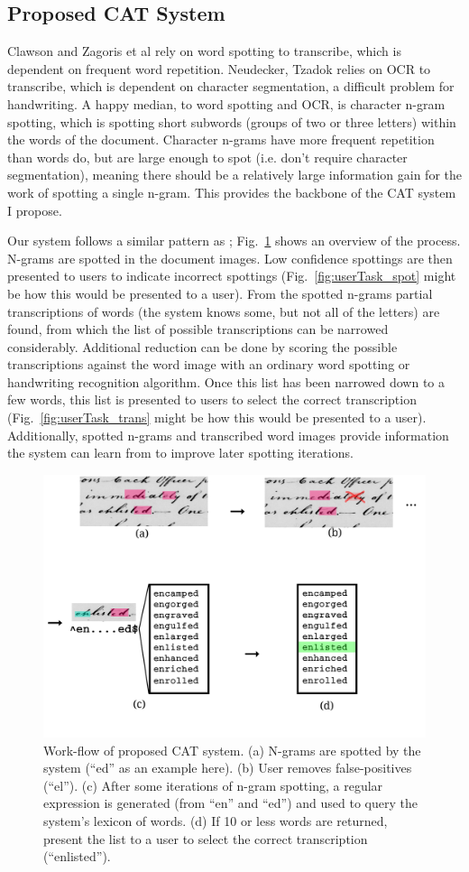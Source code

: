 \documentclass[conference]{IEEEtran}
\begin{document}
\subsection{Proposed CAT System}
Clawson\cite{Clawson2014} and Zagoris et al\cite{Zagoris2015} rely on word spotting to transcribe, which is dependent on frequent word repetition. Neudecker, Tzadok\cite{Neudecker2010} relies on OCR to transcribe, which is dependent on character segmentation, a difficult problem for handwriting.
A happy median, to word spotting and OCR, is character n-gram spotting, which is spotting short subwords (groups of two or three letters) within the words of the document. Character n-grams have more frequent repetition than words do, but are large enough to spot (i.e. don't require character segmentation), meaning there should be a relatively large information gain for the work of spotting a single n-gram. This provides the backbone of the CAT system I propose.


Our system follows a similar pattern as \cite{Neudecker2010}; Fig.~\ref{fig:system_diagram} shows an overview of the process. N-grams are spotted in the document images. Low confidence spottings are then presented to users to indicate incorrect spottings (Fig.~\ref{fig:userTask_spot} might be how this would be presented to a user). From the spotted n-grams partial transcriptions of words (the system knows some, but not all of the letters) are found, from which the list of possible transcriptions can be narrowed considerably. Additional reduction can be done by scoring the possible transcriptions against the word image with an ordinary word spotting or handwriting recognition algorithm. Once this list has been narrowed down to a few words, this list is presented to users to select the correct transcription (Fig.~\ref{fig:userTask_trans} might be how this would be presented to a user). Additionally, spotted n-grams and transcribed word images provide information the system can learn from to improve later spotting iterations.

\begin{figure}
    \centering
    \includegraphics[width=.45\textwidth]{flow5}
    \caption{Work-flow of proposed CAT system. (a) N-grams are spotted by the system (``ed'' as an example here). (b) User removes false-positives (``el''). (c) After some iterations of n-gram spotting, a regular expression is generated (from ``en'' and ``ed'') and used to query the system's lexicon of words. (d) If 10 or less words are returned, present the list to a user to select the correct transcription (``enlisted'').}
    \label{fig:system_diagram}
\end{figure}
\end{document}
